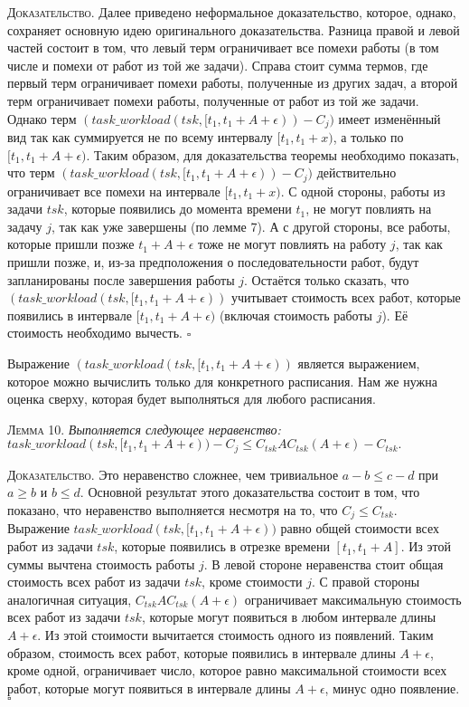 \textsc{Доказательство.}
  Далее приведено неформальное доказательство, которое, однако, сохраняет основную идею
  оригинального доказательства. Разница правой и левой частей состоит в том, что
  левый терм ограничивает все помехи работы (в том числе и помехи от работ из той же задачи).
  Справа стоит сумма термов, где
    первый терм ограничивает помехи работы, полученные из других задач,
    а второй терм ограничивает помехи работы, полученные от работ из той же задачи.
  Однако терм $(task\_workload(tsk, [t_1, t_1 + A + \epsilon)) - C_{j})$
    имеет изменённый вид так как суммируется не по всему интервалу $[t_1, t_1 + x)$,
    а только по $[t_1, t_1 + A + \epsilon)$.
  Таким образом, для доказательства теоремы необходимо показать,
    что терм $(task\_workload(tsk, [t_1, t_1 + A + \epsilon)) - C_{j})$
    действительно ограничивает все помехи на интервале $[t_1, t_1 + x)$.
  С одной стороны, работы из задачи $tsk$, которые появились до момента времени $t_1$,
    не могут повлиять на задачу $j$, так как уже завершены (по лемме 7).
  А с другой стороны, все работы, которые пришли позже $t_1 + A + \epsilon$ тоже
    не могут повлиять на работу $j$, так как пришли позже, и, из-за предположения
    о последовательности работ, будут запланированы после завершения работы $j$.
  Остаётся только сказать, что $(task\_workload(tsk, [t_1, t_1 + A + \epsilon))$
    учитывает стоимость всех работ, которые появились в интервале $[t_1, t_1 + A + \epsilon)$
    (включая стоимость работы $j$). Её стоимость необходимо вычесть. $\square$

Выражение $(task\_workload(tsk, [t_1, t_1 + A + \epsilon))$ является выражением,
  которое можно вычислить только для конкретного расписания. Нам же нужна оценка сверху,
  которая будет выполняться для любого расписания.

\textsc{Лемма 10.}
\textit{Выполняется следующее неравенство: \\
$task\_workload(tsk, [t_1, t_1 + A + \epsilon)) - C_{j} \leq C_{tsk}AC_{tsk}(A + \epsilon) - C_{tsk}.$
}

\textsc{Доказательство.} Это неравенство сложнее, чем тривиальное $a - b \leq c - d$ при $ a \geq b$ и $b \leq d$.
  Основной результат этого доказательства состоит в том, что показано,
  что неравенство выполняется несмотря на то, что $C_{j} \leq C_{tsk}$.
  Выражение $task\_workload(tsk, [t_1, t_1 + A + \epsilon))$ равно
    общей стоимости всех работ из задачи $tsk$, которые появились в
    отрезке времени $[t_1, t_1 + A]$. Из этой суммы вычтена стоимость работы $j$.
  В левой стороне неравенства стоит общая стоимость всех работ из задачи $tsk$, кроме стоимости $j$.
  С правой стороны аналогичная ситуация, $C_{tsk}AC_{tsk}(A + \epsilon)$ ограничивает
    максимальную стоимость всех работ из задачи $tsk$, которые могут появиться
    в любом интервале длины $A + \epsilon$. Из этой стоимости вычитается стоимость
    одного из появлений. Таким образом, стоимость всех работ, которые появились
    в интервале длины $A + \epsilon$, кроме одной,
   ограничивает число, которое равно максимальной стоимости всех работ,
    которые могут появиться в интервале длины $A + \epsilon$, минус одно появление. $\square$

